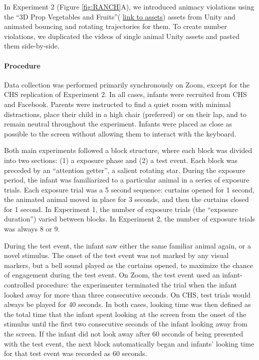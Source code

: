 \documentclass[
]{article}
\begin{document}
In Experiment 2 (Figure \ref{fig:RANCH}A), we introduced animacy violations using the ``3D Prop Vegetables and Fruits''( \href{https://marketplace.unity.com/packages/3d/props/food/3d-prop-vegetables-and-fruits-237790}{link to assets}) assets from Unity and animated bouncing and rotating trajectories for them. To create number violations, we duplicated the videos of single animal Unity assets and pasted them side-by-side.

\hypertarget{procedure}{%
\paragraph{Procedure}\label{procedure}}

Data collection was performed primarily synchronously on Zoom, except for the CHS replication of Experiment 2. In all cases, infants were recruited from CHS \autocite{scott2017lookit} and Facebook. Parents were instructed to find a quiet room with minimal distractions, place their child in a high chair (preferred) or on their lap, and to remain neutral throughout the experiment. Infants were placed as close as possible to the screen without allowing them to interact with the keyboard.

Both main experiments followed a block structure, where each block was divided into two sections: (1) a exposure phase and (2) a test event. Each block was preceded by an ``attention getter'', a salient rotating star. During the exposure period, the infant was familiarized to a particular animal in a series of exposure trials. Each exposure trial was a 5 second sequence: curtains opened for 1 second, the animated animal moved in place for 3 seconds, and then the curtains closed for 1 second. In Experiment 1, the number of exposure trials (the ``exposure duration'') varied between blocks. In Experiment 2, the number of exposure trials was always 8 or 9.

During the test event, the infant saw either the same familiar animal again, or a novel stimulus. The onset of the test event was not marked by any visual markers, but a bell sound played as the curtains opened, to maximize the chance of engagement during the test event. On Zoom, the test event used an infant-controlled procedure: the experimenter terminated the trial when the infant looked away for more than three consecutive seconds. On CHS, test trials would always be played for 40 seconds. In both cases, looking time was then defined as the total time that the infant spent looking at the screen from the onset of the stimulus until the first two consecutive seconds of the infant looking away from the screen. If the infant did not look away after 60 seconds of being presented with the test event, the next block automatically began and infants' looking time for that test event was recorded as 60 seconds.
\end{document}
